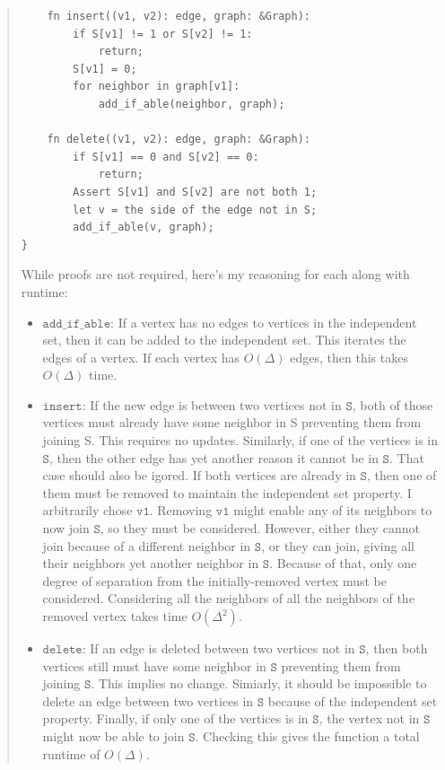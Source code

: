 \documentclass[11pt]{article}
\newcommand{\code}[1]{$\texttt{#1}$}
\begin{document}
\begin{enumerate}
\begin{enumerate}[resume]
\begin{quote}
\begin{verbatim}
    fn insert((v1, v2): edge, graph: &Graph):
        if S[v1] != 1 or S[v2] != 1:
            return;
        S[v1] = 0;
        for neighbor in graph[v1]:
            add_if_able(neighbor, graph);

    fn delete((v1, v2): edge, graph: &Graph):
        if S[v1] == 0 and S[v2] == 0:
            return;
        Assert S[v1] and S[v2] are not both 1;
        let v = the side of the edge not in S;
        add_if_able(v, graph);
}
\end{verbatim}
    While proofs are not required, here's my reasoning for each along with runtime:
    \begin{itemize}
      \item \code{add\_if\_able}: If a vertex has no edges to vertices in the independent set, then it can be added to the independent set. This iterates the edges of a vertex. If each vertex has $O(\Delta)$ edges, then this takes $O(\Delta)$ time.
      \item \code{insert}: If the new edge is between two vertices not in \code{S}, both of those vertices must already have some neighbor in S preventing them from joining S. This requires no updates. Similarly, if one of the vertices is in \code{S}, then the other edge has yet another reason it cannot be in \code{S}. That case should also be igored. If both vertices are already in \code{S}, then one of them must be removed to maintain the independent set property. I arbitrarily chose \code{v1}. Removing \code{v1} might enable any of its neighbors to now join \code{S}, so they must be considered. However, either they cannot join because of a different neighbor in \code{S}, or they can join, giving all their neighbors yet another neighbor in \code{S}. Because of that, only one degree of separation from the initially-removed vertex must be considered. Considering all the neighbors of all the neighbors of the removed vertex takes time $O(\Delta^2)$.
      \item \code{delete}: If an edge is deleted between two vertices not in \code{S}, then both vertices still must have some neighbor in \code{S} preventing them from joining \code{S}. This implies no change. Simiarly, it should be impossible to delete an edge between two vertices in \code{S} because of the independent set property. Finally, if only one of the vertices is in \code{S}, the vertex not in \code{S} might now be able to join \code{S}. Checking this gives the function a total runtime of $O(\Delta)$.
    \end{itemize}
    \end{quote}

\end{enumerate}
\end{enumerate}
\end{document}
